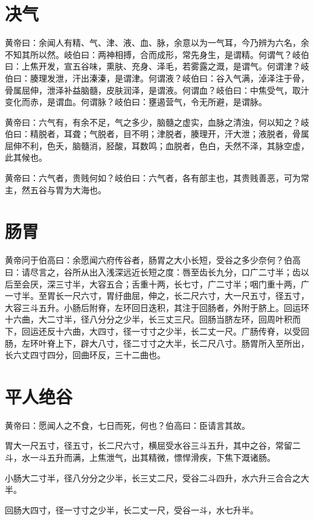 \documentclass[12pt,UTF8]{ctexbook}
\begin{document}
	
	\chapter{决气}
	
	黄帝曰：余闻人有精、气、津、液、血、脉，余意以为一气耳，今乃辨为六名，余不知其所以然。岐伯曰：两神相搏，合而成形，常先身生，是谓精。何谓气？岐伯曰：上焦开发，宣五谷味，熏肤、充身、泽毛，若雾露之溉，是谓气。何谓津？岐伯曰：腠理发泄，汗出溱溱，是谓津。何谓液？岐伯曰：谷入气满，淖泽注于骨，骨属屈伸，泄泽补益脑髓，皮肤润泽，是谓液。何谓血？岐伯曰：中焦受气，取汁变化而赤，是谓血。何谓脉？岐伯曰：壅遏营气，令无所避，是谓脉。
	
	黄帝曰：六气有，有余不足，气之多少，脑髓之虚实，血脉之清浊，何以知之？岐伯曰：精脱者，耳聋；气脱者，目不明；津脱者，腠理开，汗大泄；液脱者，骨属屈伸不利，色夭，脑髓消，胫酸，耳数鸣；血脱者，色白，夭然不泽，其脉空虚，此其候也。
	
	黄帝曰：六气者，贵贱何如？岐伯曰：六气者，各有部主也，其贵贱善恶，可为常主，然五谷与胃为大海也。
	\chapter{肠胃}
	
	黄帝问于伯高曰：余愿闻六府传谷者，肠胃之大小长短，受谷之多少奈何？伯高曰：请尽言之，谷所从出入浅深远近长短之度：唇至齿长九分，口广二寸半；齿以后至会厌，深三寸半，大容五合；舌重十两，长七寸，广二寸半；咽门重十两，广一寸半。至胃长一尺六寸，胃纡曲屈，伸之，长二尺六寸，大一尺五寸，径五寸，大容三斗五升。小肠后附脊，左环回日迭积，其注于回肠者，外附于脐上。回运环十六曲，大二寸半，径八分分之少半，长三丈三尺。回肠当脐左环，回周叶积而下，回运还反十六曲，大四寸，径一寸寸之少半，长二丈一尺。广肠传脊，以受回肠，左环叶脊上下，辟大八寸，径二寸寸之大半，长二尺八寸。肠胃所入至所出，长六丈四寸四分，回曲环反，三十二曲也。
	\chapter{平人绝谷}
	
	黄帝曰：愿闻人之不食，七日而死，何也？伯高曰：臣请言其故。
	
	胃大一尺五寸，径五寸，长二尺六寸，横屈受水谷三斗五升，其中之谷，常留二斗，水一斗五升而满，上焦泄气，出其精微，慓悍滑疾，下焦下溉诸肠。
	
	小肠大二寸半，径八分分之少半，长三丈二尺，受谷二斗四升，水六升三合合之大半。
	
	回肠大四寸，径一寸寸之少半，长二丈一尺，受谷一斗，水七升半。
	
\end{document}
